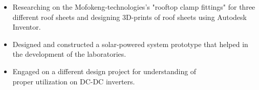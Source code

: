 \documentclass[10pt,a4paper,ragged2e]{altacv}
\begin{document}
\begin{itemize}
\item Researching on the Mofokeng-technologies's "rooftop clamp fittings" for three different roof sheets and designing 3D-prints of roof sheets using Autodesk Inventor.

\end{itemize}


\divider



\begin{itemize}
\item Designed and constructed a solar-powered system prototype that helped in the development of the laboratories.
\item Engaged on a different design project for understanding of\\ proper utilization on DC-DC inverters.
\end{itemize}


\end{document}
